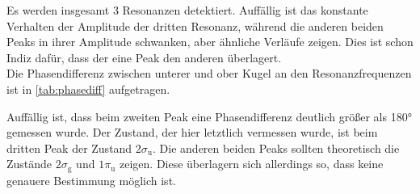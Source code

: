 Es werden insgesamt 3 Resonanzen detektiert. Auffällig ist das konstante Verhalten der Amplitude
der dritten Resonanz, während die anderen beiden Peaks in ihrer Amplitude schwanken, aber ähnliche
Verläufe zeigen. Dies ist schon Indiz dafür, dass der eine Peak den anderen überlagert. \\
Die Phasendifferenz zwischen unterer und ober Kugel an den Resonanzfrequenzen ist in \autoref{tab:phasediff}
aufgetragen.

Auffällig ist, dass beim zweiten Peak eine Phasendifferenz deutlich größer als 180$°$ gemessen wurde.
Der Zustand, der hier letztlich vermessen wurde, ist beim dritten Peak der Zustand $ 2 \sigma_{\text{u}}$.
Die anderen beiden Peaks sollten theoretisch die Zustände $2 \sigma_{\text{g}}$ und 
$1 \pi_{\text{u}}$ zeigen. Diese überlagern sich allerdings so, dass keine genauere Bestimmung möglich ist.

